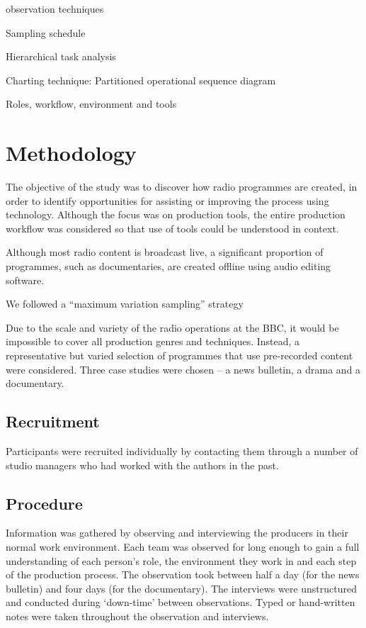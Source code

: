 observation techniques

Sampling schedule

Hierarchical task analysis
\citep{Kirwan1992}
\citep{Annett2000}

Charting technique: Partitioned operational sequence diagram
\citep{Kirwan1992}

Roles, workflow, environment and tools

\section{Methodology}\label{sec:ethno-method}


The objective of the study was to discover how radio programmes are created, in order to identify opportunities for
assisting or improving the process using technology. Although the focus was on production tools, the entire production
workflow was considered so that use of tools could be understood in context.

Although most radio content is broadcast live, a significant proportion of programmes, such as documentaries, are
created offline using audio editing software.

We followed a ``maximum variation sampling'' strategy \citep[p. 172]{Patton1990}

Due to the scale and variety of the radio operations at the BBC, it would be impossible to cover all production genres
and techniques.  Instead, a representative but varied selection of programmes that use pre-recorded content were
considered. Three case studies were chosen --  a news bulletin, a drama and a documentary.

\subsection{Recruitment}
Participants were recruited individually by contacting them through a number of studio managers who had worked with the
authors in the past. 

\subsection{Procedure}
Information was gathered by observing and interviewing the producers in their normal work environment. Each team was
observed for long enough to gain a full understanding of each person's role, the environment they work in and each step
of the production process. The observation took between half a day (for the news bulletin) and four days (for the
documentary). The interviews were unstructured and conducted during `down-time' between observations.  Typed or
hand-written notes were taken throughout the observation and interviews.


